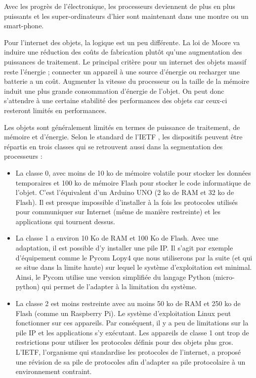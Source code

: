 Avec les progrès de l’électronique, les processeurs deviennent de plus en plus puissants et les super-ordinateurs d’hier sont maintenant dans une montre ou un smart-phone. 

Pour l’internet des objets, la logique est un peu différente. La loi de Moore va induire une réduction des coûts de fabrication plutôt qu'une augmentation des puissances de traitement. Le principal critère pour un internet des objets massif reste l’énergie ; connecter un appareil à une source d’énergie ou recharger une batterie a un coût. Augmenter la vitesse du processeur ou la taille de la mémoire induit une plus grande consommation d’énergie de l'objet. On peut donc s’attendre à une certaine stabilité des performances des objets car ceux-ci resteront limités en performances.

Les objets sont généralement limités en termes de puissance de traitement, de mémoire et d’énergie. Selon le standard de l’IETF , les dispositifs peuvent être répartis en trois classes qui se retrouvent aussi dans la segmentation des processeurs :

\begin{itemize}
\item La classe 0, avec moins de 10 ko de mémoire volatile pour stocker les données temporaires et 100 ko de mémoire Flash pour stocker le code informatique de l'objet. C'est l’équivalent d’un Arduino UNO (2 ko de RAM et 32 ko de Flash). Il est presque impossible d’installer à la fois les protocoles utilisés pour communiquer sur Internet (même de manière restreinte) et les applications qui tournent dessus. 
\item La classe 1 a environ 10 Ko de RAM et 100 Ko de Flash. Avec une adaptation, il est possible d’y installer une pile IP. Il s'agit par exemple d'équipement comme le Pycom Lopy4 que nous utiliserons par la suite (et qui se situe dans la limite haute) sur lequel le système d'exploitation est minimal. Ainsi, le Pycom utilise une version simplifiée du langage Python (micro-python) qui permet de l'adapter à la limitation du système.
\item La classe 2 est moins restreinte avec au moins 50 ko de RAM et 250 ko de Flash (comme un Raspberry Pi). Le système d’exploitation Linux peut fonctionner sur ces appareils. Par conséquent, il y a peu de limitations sur la pile IP et les applications s’y exécutant.
Les appareils de classe 1 ont trop de restrictions pour utiliser les protocoles définis pour des objets plus gros. L’\ac{IETF}, l'organisme qui standardise les protocoles de l'internet, a proposé une révision de sa pile de protocoles afin d’adapter sa pile protocolaire à un environnement contraint.
\end{itemize}


